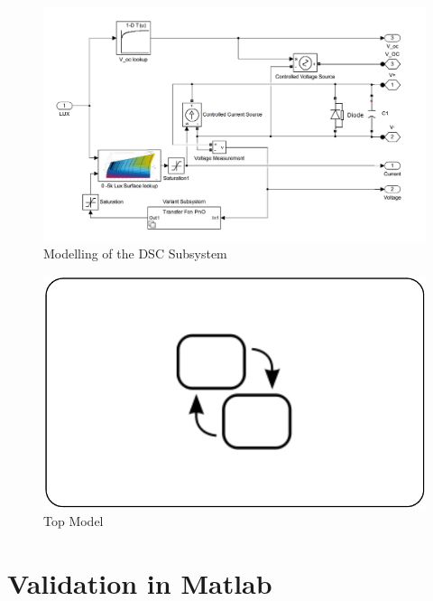 \begin{figure}[H]
  \begin{center}
  \includegraphics[width=\textwidth]{images/PV_block_Model}
  \caption{Modelling of the DSC Subsystem }
  \label{fig:PV_block_Model}
  \end{center}
  \end{figure}

\begin{figure}[H]
  \begin{center}
 \includegraphics[width=\textwidth]{images/IC_stateflow}
  \caption{Top Model }
  \label{fig:Model_top}
  \end{center}
  \end{figure}



\section {Validation in Matlab{\textregistered}}

